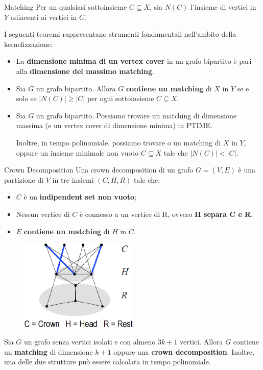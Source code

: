 \documentclass[10pt,a4paper]{article}
\begin{document}
\begin{multicols}{3}
\begin{textbox}{Matching}
Per un qualsiasi sottoinsieme \(C\subseteq X\), sia \(N(C)\) l’insieme di vertici in
\(Y\) adiacenti ai vertici in \(C\).

I seguenti teoremi rappresentano strumenti fondamentali
nell’ambito della kernelizzazione:
\begin{itemize}[leftmargin=*]
    \item La \textbf{dimensione minima di un vertex cover} in un grafo bipartito è pari alla \textbf{dimensione del massimo matching}.
    \item Sia \(G\) un grafo bipartito. Allora \(G\) \textbf{contiene un matching} di \(X\) in \(Y\) se e solo se \(|N(C)|\geq |C|\) per ogni sottoinsieme \(C\subseteq X\).
    \item Sia \(G\) un grafo bipartito. Possiamo trovare un matching di dimensione massima
    (e un vertex cover di dimensione minima) in PTIME. 
    
    Inoltre, in tempo polinomiale, possiamo trovare o un matching di 
    \(X\) in \(Y\), oppure un insieme minimale non vuoto \(C\subseteq X\) tale che \(|N(C)|<|C|\).
\end{itemize}
\end{textbox}

\begin{textbox}{Crown Decomposition}
Una crown decomposition di un grafo \(G=(V,E)\) è una partizione di
\(V\) in tre insiemi \((C,H,R)\) tale che:
\begin{itemize}[leftmargin=*]
    \item \(C\) è un \textbf{indipendent set non vuoto};
    \item Nessun vertice di \(C\) è connesso a un vertice di R, ovvero \textbf{H separa C e R};
    \item \(E\) \textbf{contiene un matching} di \(H\) in \(C\). 
\end{itemize}
\vspace{-15pt}
\begin{figure}[H]
    \centering
    \includegraphics[width=0.5\textwidth]{crown.png}
\end{figure}
\vspace{-15pt}
Sia \(G\) un grafo senza vertici isolati e con
almeno \(3k+1\) vertici. Allora \(G\) contiene
un \textbf{matching} di dimensione \(k+1\) oppure
una \textbf{crown decomposition}.
Inoltre, una delle due strutture può essere calcolata
in tempo polinomiale.
\end{textbox}


\end{multicols}
\end{document}
